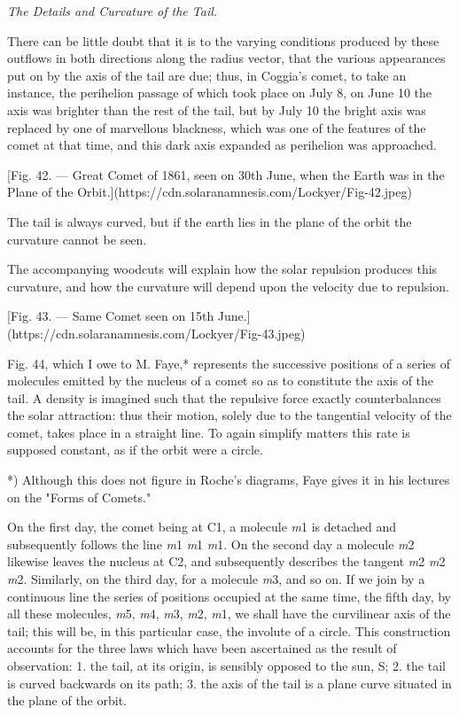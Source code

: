 \documentclass[a4paper, 12pt, oneside, polutonikogreek, english]{article}
\begin{document}
\emph{The Details and Curvature of the Tail.}

There can be little doubt that it is to the varying conditions produced by these outflows in both directions along the radius vector, that the various appearances put on by the axis of the tail are due; thus, in Coggia's comet, to take an instance, the perihelion passage of which took place on July 8, on June 10 the axis was brighter than the rest of the tail, but by July 10 the bright axis was replaced by one of marvellous blackness, which was one of the features of the comet at that time, and this dark axis expanded as perihelion was approached.

[Fig. 42. --- Great Comet of 1861, seen on 30th June, when the Earth was in the Plane of the Orbit.](https://cdn.solaranamnesis.com/Lockyer/Fig-42.jpeg)

The tail is always curved, but if the earth lies in the plane of the orbit the curvature cannot be seen.

The accompanying woodcuts will explain how the solar repulsion produces this curvature, and how the curvature will depend upon the velocity due to repulsion.

[Fig. 43. --- Same Comet seen on 15th June.](https://cdn.solaranamnesis.com/Lockyer/Fig-43.jpeg)

Fig. 44, which I owe to M. Faye,* represents the successive positions of a series of molecules emitted by the nucleus of a comet so as to constitute the axis of the tail. A density is imagined such that the repulsive force exactly counterbalances the solar attraction: thus their motion, solely due to the tangential velocity of the comet, takes place in a straight line. To again simplify matters this rate is supposed constant, as if the orbit were a circle.

*) Although this does not figure in Roche's diagrams, Faye gives it in his lectures on the "Forms of Comets."

On the first day, the comet being at C1, a molecule \emph{m}1 is detached and subsequently follows the line \emph{m}1 \emph{m}1 \emph{m}1. On the second day a molecule \emph{m}2 likewise leaves the nucleus at C2, and subsequently describes the tangent \emph{m}2 \emph{m}2 \emph{m}2. Similarly, on the third day, for a molecule \emph{m}3, and so on. If we join by a continuous line the series of positions occupied at the same time, the fifth day, by all these molecules, \emph{m}5, \emph{m}4, \emph{m}3, \emph{m}2, \emph{m}1, we shall have the curvilinear axis of the tail; this will be, in this particular case, the involute of a circle. This construction accounts for the three laws which have been ascertained as the result of observation: 1.
the tail, at its origin, is sensibly opposed to the sun, S; 2. the tail is curved backwards on its path; 3. the axis of the tail is a plane curve situated in the plane of the orbit.
\end{document}
